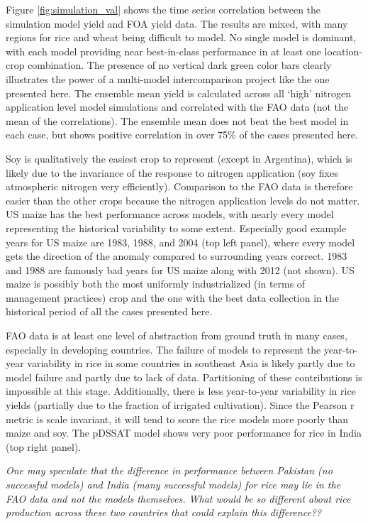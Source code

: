 \documentclass[preprint, 5p, times, twocolumn]{elsarticle}
\begin{document}
Figure \ref{fig:simulation_val} shows the time series correlation between the simulation model yield and FOA yield data. The results are mixed, with many regions for rice and wheat being difficult to model. No single model is dominant, with each model providing near best-in-class performance in at least one location-crop combination. The presence of no vertical dark green color bars clearly illustrates the power of a multi-model intercomparison project like the one presented here. The ensemble mean yield is calculated across all `high' nitrogen application level model simulations and correlated with the FAO data (not the mean of the correlations). The ensemble mean does not beat the best model in each case, but shows positive correlation in over 75\% of the cases presented here.

Soy is qualitatively the easiest crop to represent (except in Argentina), which is likely due to the invariance of the response to nitrogen application (soy fixes atmospheric nitrogen very efficiently). Comparison to the FAO data is therefore easier than the other crops because the nitrogen application levels do not matter. US maize has the best performance across models, with nearly every model representing the historical variability to some extent. Especially good example years for US maize are 1983, 1988, and 2004 (top left panel), where every model gets the direction of the anomaly compared to surrounding years correct. 1983 and 1988 are famously bad years for US maize along with 2012 (not shown). US maize is possibly both the most uniformly industrialized (in terms of management practices) crop and the one with the best data collection in the historical period of all the cases presented here.

FAO data is at least one level of abstraction from ground truth in many cases, especially in developing countries. The failure of models to represent the year-to-year variability in rice in some countries in southeast Asia is likely partly due to model failure and partly due to lack of data. Partitioning of these contributions is impossible at this stage. Additionally, there is less year-to-year variability in rice yields (partially due to the fraction of irrigated cultivation). Since the Pearson r metric is scale invariant, it will tend to score the rice models more poorly than maize and soy. The pDSSAT model shows very poor performance for rice in India (top right panel).

\textit{One may speculate that the difference in performance between Pakistan (no successful models) and India (many successful models) for rice may lie in the FAO data and not the models themselves. What would be so different about rice production across these two countries that could explain this difference??}
\end{document}
